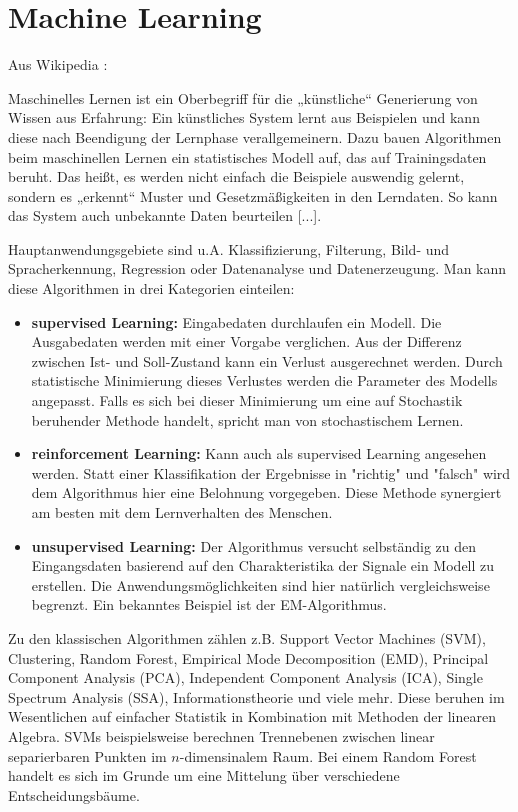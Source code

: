 	\section{Machine Learning}
	Aus Wikipedia \autocite{wikiML}:
	
	Maschinelles Lernen ist ein Oberbegriff für die „künstliche“ Generierung von Wissen aus Erfahrung: Ein künstliches System lernt aus Beispielen und kann diese nach Beendigung der Lernphase verallgemeinern. Dazu bauen Algorithmen beim maschinellen Lernen ein statistisches Modell auf, das auf Trainingsdaten beruht. Das heißt, es werden nicht einfach die Beispiele auswendig gelernt, sondern es „erkennt“ Muster und Gesetzmäßigkeiten in den Lerndaten. So kann das System auch unbekannte Daten beurteilen [...].
	
	Hauptanwendungsgebiete sind u.A. Klassifizierung, Filterung, Bild- und Spracherkennung, Regression oder Datenanalyse und Datenerzeugung.
	Man kann diese Algorithmen in drei Kategorien einteilen:
	
	\begin{itemize}
		\item \textbf{supervised Learning:} Eingabedaten durchlaufen ein Modell. Die Ausgabedaten werden mit einer Vorgabe verglichen. Aus der Differenz zwischen Ist- und Soll-Zustand kann ein Verlust ausgerechnet werden. Durch statistische Minimierung dieses Verlustes werden die Parameter des Modells angepasst. Falls es sich bei dieser Minimierung um eine auf Stochastik beruhender Methode handelt, spricht man von stochastischem Lernen.
		\newpage
		\item \textbf{reinforcement Learning:} Kann auch als supervised Learning angesehen werden. Statt einer Klassifikation der Ergebnisse in "richtig" und "falsch" wird dem Algorithmus hier eine Belohnung vorgegeben. Diese Methode synergiert am besten mit dem Lernverhalten des Menschen.
		\item \textbf{unsupervised Learning:} Der Algorithmus versucht selbständig zu den Eingangsdaten basierend auf den Charakteristika der Signale ein Modell zu erstellen. Die Anwendungsmöglichkeiten sind hier natürlich vergleichsweise begrenzt. Ein bekanntes Beispiel ist der EM-Algorithmus.
	\end{itemize}
	
	Zu den klassischen Algorithmen zählen z.B. Support Vector Machines (SVM), Clustering, Random Forest, Empirical Mode Decomposition (EMD), Principal Component Analysis (PCA), Independent Component Analysis (ICA), Single Spectrum Analysis (SSA), Informationstheorie und viele mehr. Diese beruhen im Wesentlichen auf einfacher Statistik in Kombination mit Methoden der linearen Algebra.  SVMs beispielsweise berechnen Trennebenen zwischen linear separierbaren Punkten im $n$-dimensinalem Raum. Bei einem Random Forest handelt es sich im Grunde um eine Mittelung über verschiedene Entscheidungsbäume.
	
